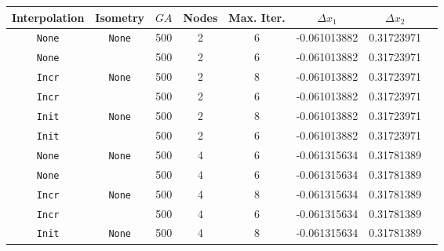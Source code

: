 
\begin{tabular*}{\textwidth}{@{\extracolsep\fill}cccccccc@{}}
\toprule
\textbf{Interpolation}   & \textbf{Isometry} & %
\(GA\) &  \textbf{Nodes}   &
\textbf{Max. Iter.} &
\(\Delta x_1\)   & \(\Delta x_2\) 
\\
\midrule
%
  \texttt{None}   &  \texttt{None} &  500   & 2 &     6 & -0.061013882  &          0.31723971 \\
  \texttt{None}   &  \Spherical{} &  500   & 2 &     6 & -0.061013882  &          0.31723971 \\
  \texttt{Incr}   &  \texttt{None} &  500   & 2 &     8 & -0.061013882  &          0.31723971 \\
  \texttt{Incr}   &  \Spherical{} &  500   & 2 &     6 & -0.061013882  &          0.31723971 \\
  \texttt{Init}   &  \texttt{None} &  500   & 2 &     8 & -0.061013882  &          0.31723971 \\
  \texttt{Init}   &  \Spherical{} &  500   & 2 &     6 & -0.061013882  &          0.31723971 \\
  \texttt{None}   &  \texttt{None} &  500   & 4 &     6 & -0.061315634  &          0.31781389 \\
  \texttt{None}   &  \Spherical{} &  500   & 4 &     6 & -0.061315634  &          0.31781389 \\
  \texttt{Incr}   &  \texttt{None} &  500   & 4 &     8 & -0.061315634  &          0.31781389 \\
  \texttt{Incr}   &  \Spherical{} &  500   & 4 &     6 & -0.061315634  &          0.31781389 \\
  \texttt{Init}   &  \texttt{None} &  500   & 4 &     8 & -0.061315634  &          0.31781389 \\

\end{tabular*}
